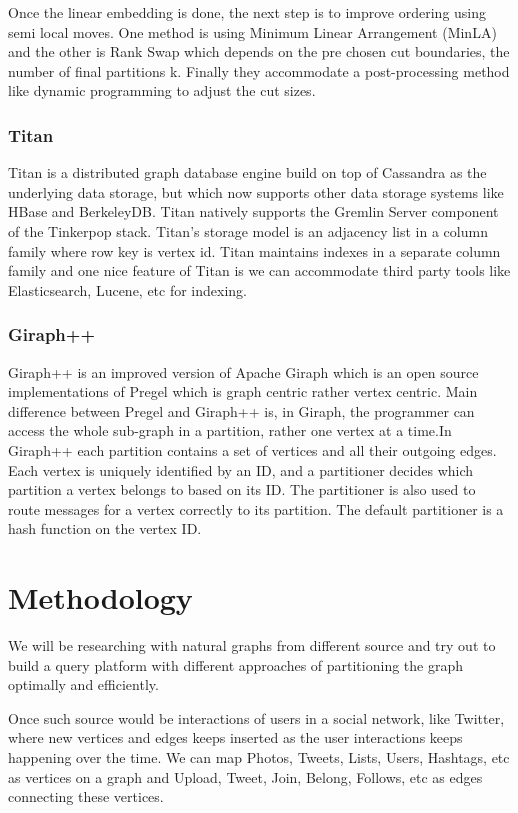 \documentclass[12pt]{article}
\begin{document}
Once the linear embedding is done, the next step is to  improve ordering using semi local moves. One method is using Minimum Linear Arrangement (MinLA)\cite{MinLA} and the other is Rank Swap which depends on the pre chosen cut boundaries, the number of final partitions k. Finally they accommodate a post-processing method like dynamic programming to adjust the cut sizes.

\subsubsection{Titan}
Titan is a distributed graph database engine build on top of Cassandra as the underlying data storage, but which now supports other data storage systems like HBase and BerkeleyDB. Titan natively supports the Gremlin Server component of the Tinkerpop stack. Titan’s storage model is an adjacency list in a column family where row key is vertex id. Titan maintains indexes in a separate column family and one nice feature of Titan is we can accommodate third party tools like Elasticsearch, Lucene, etc for indexing.

\subsubsection{Giraph++}
Giraph++\cite{GiraphPlusPlus} is an improved version of Apache Giraph which is an open source  implementations of Pregel which is graph centric rather vertex centric. Main difference between Pregel and Giraph++ is, in Giraph, the programmer can access the whole sub-graph in a partition, rather one vertex at a time.In Giraph++ each partition contains a set of vertices and all their outgoing edges. Each vertex is uniquely identified by an ID, and a partitioner decides which partition a vertex belongs to based on its ID. The partitioner is also used to route messages for a vertex correctly to its partition. The default partitioner is a hash function on the vertex ID.



\clearpage 
\section{Methodology}

We will be researching with natural graphs from different source and try out to build a query platform with different approaches of partitioning the graph optimally and efficiently. 

Once such source would be interactions of users in a social network, like Twitter, where new vertices and edges keeps inserted as the user interactions keeps happening over the time. We can map Photos, Tweets, Lists, Users, Hashtags, etc as vertices on a graph and Upload, Tweet, Join, Belong, Follows, etc as edges connecting these vertices.
\end{document}
